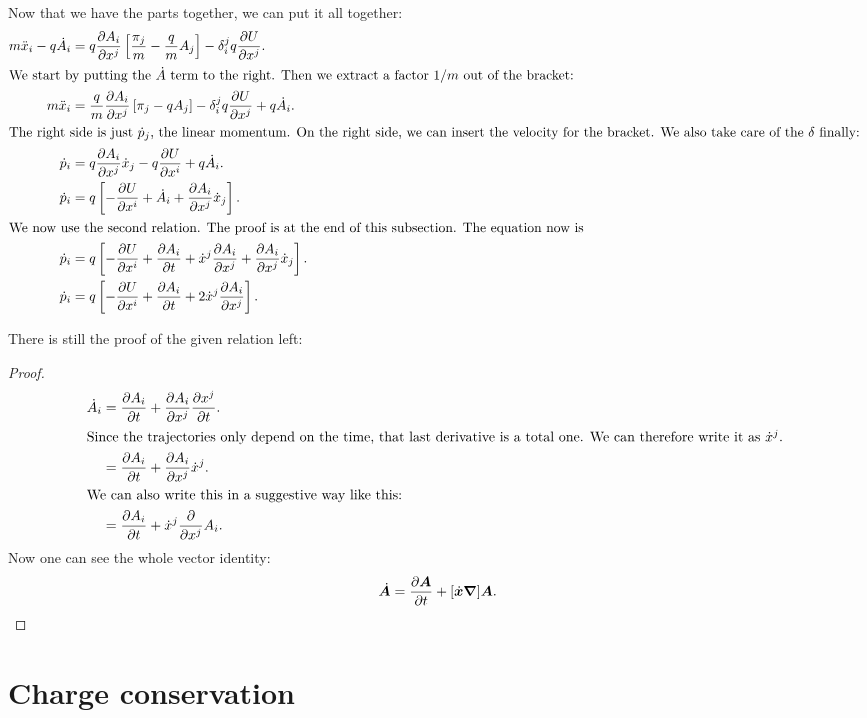\documentclass[11pt, english, fleqn, DIV=15, headinclude, BCOR=1cm]{scrartcl}
\begin{document}
Now that we have the parts together, we can put it all together:
\begin{align*}
    m \ddot x_i - q \dot A_i &= 
    q \pd{A_i}{x^j}
    \sbr{\frac{\pi_j}m - \frac qm A_j}
    -
    \delta_i^j
    q \pd{U}{x^j}. \\
    \intertext{%
        We start by putting the $\dot A$ term to the right. Then we extract a
        factor $1/m$ out of the bracket:
    }
    m \ddot x_i &= \frac qm \pd{A_i}{x^j} \sbr{\pi_j - q
    A_j} - \delta_i^j q \pd{U}{x^j} + q \dot A_i. \\
    \intertext{%
        The right side is just $\dot p_j$, the linear momentum. On the right
        side, we can insert the velocity for the bracket. We also take care of
        the $\delta$ finally:
    }
    \dot p_i &= q \pd{A_i}{x^j} \dot x_j - q \pd{U}{x^i} + q \dot A_i. \\
    \dot p_i &= q \sbr{- \pd{U}{x^i} + \dot A_i + \pd{A_i}{x^j} \dot x_j}. \\
    \intertext{%
        We now use the second relation. The proof is at the end of this
        subsection. The equation now is
    }
    \dot p_i &= q \sbr{- \pd{U}{x^i} + \pd{A_i}t + \dot x^j \pd{A_i}{x^j} + \pd{A_i}{x^j} \dot x_j}. \\
    \dot p_i &= q \sbr{- \pd{U}{x^i} + \pd{A_i}t + 2 \dot x^j \pd{A_i}{x^j}}. \\
\end{align*}

\fehlt

There is still the proof of the given relation left:

\begin{proof}
    \begin{align*}
        \dot A_i
        &= \pd{A_i}t + \pd{A_i}{x^j} \pd{x^j}{t}. \\
        \intertext{%
            Since the trajectories only depend on the time, that last
            derivative is a total one. We can therefore write it as $\dot x^j$.
        }
        &= \pd{A_i}t + \pd{A_i}{x^j} \dot x^j. \\
        \intertext{%
            We can also write this in a suggestive way like this:
        }
        &= \pd{A_i}t + \dot x^j \pd{}{x^j} A_i.
    \end{align*}
    Now one can see the whole vector identity:
    \[
        \dot{\boldsymbol{A}} = \frac{\partial {\boldsymbol{A}}}{\partial {t}} + [\dot{\boldsymbol{x}} \boldsymbol{\nabla}] \boldsymbol{A}.
    \]
\end{proof}

\section{Charge conservation} %
\end{document}
